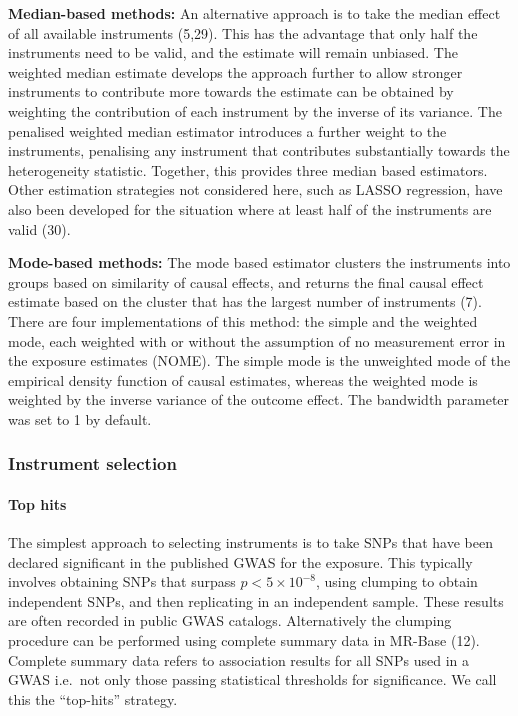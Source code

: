 \documentclass[]{article}
\let\oldparagraph\paragraph
\renewcommand{\paragraph}[1]{\oldparagraph{#1}\mbox{}}
\begin{document}
\textbf{Median-based methods:} An alternative approach is to take the
median effect of all available instruments (5,29). This has the
advantage that only half the instruments need to be valid, and the
estimate will remain unbiased. The weighted median estimate develops the
approach further to allow stronger instruments to contribute more
towards the estimate can be obtained by weighting the contribution of
each instrument by the inverse of its variance. The penalised weighted
median estimator introduces a further weight to the instruments,
penalising any instrument that contributes substantially towards the
heterogeneity statistic. Together, this provides three median based
estimators. Other estimation strategies not considered here, such as
LASSO regression, have also been developed for the situation where at
least half of the instruments are valid (30).

\textbf{Mode-based methods:} The mode based estimator clusters the
instruments into groups based on similarity of causal effects, and
returns the final causal effect estimate based on the cluster that has
the largest number of instruments (7). There are four implementations of
this method: the simple and the weighted mode, each weighted with or
without the assumption of no measurement error in the exposure estimates
(NOME). The simple mode is the unweighted mode of the empirical density
function of causal estimates, whereas the weighted mode is weighted by
the inverse variance of the outcome effect. The bandwidth parameter was
set to 1 by default.

\subsubsection{Instrument selection}\label{instrument-selection}

\paragraph{Top hits}\label{top-hits}

The simplest approach to selecting instruments is to take SNPs that have
been declared significant in the published GWAS for the exposure. This
typically involves obtaining SNPs that surpass \(p < 5 \times 10^{-8}\),
using clumping to obtain independent SNPs, and then replicating in an
independent sample. These results are often recorded in public GWAS
catalogs. Alternatively the clumping procedure can be performed using
complete summary data in MR-Base (12). Complete summary data refers to
association results for all SNPs used in a GWAS i.e.~not only those
passing statistical thresholds for significance. We call this the
``top-hits'' strategy.
\end{document}
